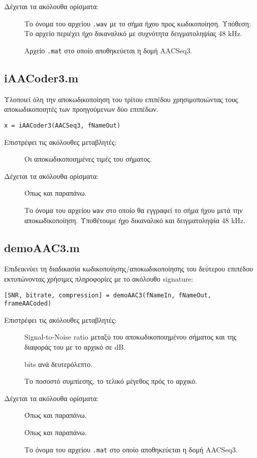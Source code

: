 \noindent Δέχεται τα ακόλουθα ορίσματα:
\begin{description}
  \item[] Το όνομα του αρχείου \verb|.wav| με το σήμα ήχου προς κωδικοποίηση. Υπόθεση: Το αρχείο περιέχει
    ήχο δικαναλικό με συχνότητα δειγματοληψίας 48 kHz.
  \item[] Αρχείο \verb|.mat| στο οποίο αποθηκεύεται η δομή AACSeq3.
\end{description}

\subsection*{iAACoder3.m}
Υλοποιεί όλη την αποκωδικοποίηση του τρίτου επιπέδου χρησιμοποιώντας τους
αποκωδικοποιητές των προηγούμενων δύο επιπέδων.
\begin{center}
  \verb|x = iAACoder3(AACSeq3, fNameOut)|
\end{center}

\noindent Επιστρέφει τις ακόλουθες μεταβλητές:
\begin{description}
  \item[] Οι αποκωδικοποιημένες τιμές του σήματος.
\end{description}

\noindent Δέχεται τα ακόλουθα ορίσματα:
\begin{description}
  \item[] Όπως και παραπάνω.
  \item[] Το όνομα του αρχείου \verb|wav| στο οποίο θα εγγραφεί το
    σήμα ήχου μετά την αποκωδικοποίηση. Υποθέτουμε ήχο δικαναλικό και
    δειγματοληψία 48 kHz.
\end{description}

\subsection*{demoAAC3.m}
Επιδεικνύει τη διαδικασία κωδικοποίησης/αποκωδικοποίησης του δεύτερου επιπέδου
εκτυπώνοντας χρήσιμες πληροφορίες με το ακόλουθο signature:
\begin{center}
  \verb|[SNR, bitrate, compression] = demoAAC3(fNameIn, fNameOut, frameAACoded)|
\end{center}

\noindent Επιστρέφει τις ακόλουθες μεταβλητές:
\begin{description}
  \item[] Signal-to-Noise ratio μεταξύ του αποκωδικοποιημένου σήματος και
    της διαφοράς του με το αρχικό σε dB.
  \item[] bits ανά δευτερόλεπτο.
  \item[] Το ποσοστό συμπίεσης, το τελικό μέγεθος πρός το αρχικό.
\end{description}

\noindent Δέχεται τα ακόλουθα ορίσματα:
\begin{description}
  \item[] Όπως και παραπάνω.
  \item[] Όπως και παραπάνω.
  \item[] Το όνομα του αρχείου \verb|.mat| στο οποίο
    αποθηκεύεται η δομή AACSeq3.
\end{description}
